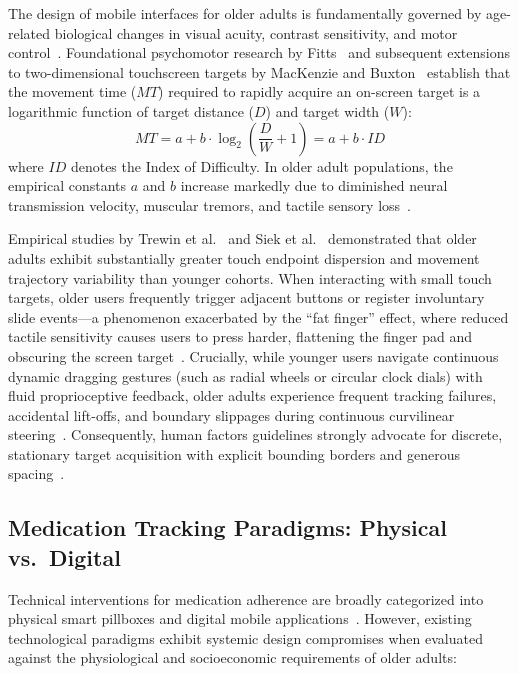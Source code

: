 \documentclass[11pt,a4paper]{article}
\begin{document}
The design of mobile interfaces for older adults is fundamentally governed by age-related biological changes in visual acuity, contrast sensitivity, and motor control~\cite{fisk2009designing,stronge2007human}. Foundational psychomotor research by Fitts~\cite{fitts1954information} and subsequent extensions to two-dimensional touchscreen targets by MacKenzie and Buxton~\cite{mackenzie1992extending} establish that the movement time ($MT$) required to rapidly acquire an on-screen target is a logarithmic function of target distance ($D$) and target width ($W$):
\begin{equation}
    MT = a + b \cdot \log_2\left(\frac{D}{W} + 1\right) = a + b \cdot ID
    \label{eq:fitts}
\end{equation}
where $ID$ denotes the Index of Difficulty. In older adult populations, the empirical constants $a$ and $b$ increase markedly due to diminished neural transmission velocity, muscular tremors, and tactile sensory loss~\cite{trewin2013physical}.

Empirical studies by Trewin et al.~\cite{trewin2013physical} and Siek et al.~\cite{siek2006fat} demonstrated that older adults exhibit substantially greater touch endpoint dispersion and movement trajectory variability than younger cohorts. When interacting with small touch targets, older users frequently trigger adjacent buttons or register involuntary slide events---a phenomenon exacerbated by the ``fat finger'' effect, where reduced tactile sensitivity causes users to press harder, flattening the finger pad and obscuring the screen target~\cite{siek2006fat,piper2010exploring}. Crucially, while younger users navigate continuous dynamic dragging gestures (such as radial wheels or circular clock dials) with fluid proprioceptive feedback, older adults experience frequent tracking failures, accidental lift-offs, and boundary slippages during continuous curvilinear steering~\cite{kurniawan2008older,wildenbos2018aging}. Consequently, human factors guidelines strongly advocate for discrete, stationary target acquisition with explicit bounding borders and generous spacing~\cite{fisk2009designing,w3c2018wcag}.

\subsection{Medication Tracking Paradigms: Physical vs.\ Digital}

Technical interventions for medication adherence are broadly categorized into physical smart pillboxes and digital mobile applications~\cite{dayer2013smartphone}. However, existing technological paradigms exhibit systemic design compromises when evaluated against the physiological and socioeconomic requirements of older adults:
\end{document}
